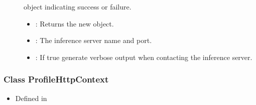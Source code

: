 \documentclass[letterpaper,10pt,english]{sphinxmanual}
\begin{document}
\begin{fulllineitems}
\begin{fulllineitems}
\begin{description}
\item[{}] \leavevmode
{\hyperref[\detokenize{cpp_api/classnvidia_1_1inferenceserver_1_1client_1_1Error:classnvidia_1_1inferenceserver_1_1client_1_1Error}]{}} object indicating success or failure. 

\item[{}] \leavevmode\begin{itemize}
\item {} 
: Returns the new {\hyperref[\detokenize{cpp_api/classnvidia_1_1inferenceserver_1_1client_1_1ProfileContext:classnvidia_1_1inferenceserver_1_1client_1_1ProfileContext}]{}} object. 

\item {} 
: The inference server name and port. 

\item {} 
: If true generate verbose output when contacting the inference server. 

\end{itemize}

\end{description}


\end{fulllineitems}


\end{fulllineitems}



\subsubsection{Class ProfileHttpContext}
\label{\detokenize{cpp_api/classnvidia_1_1inferenceserver_1_1client_1_1ProfileHttpContext:class-profilehttpcontext}}\label{\detokenize{cpp_api/classnvidia_1_1inferenceserver_1_1client_1_1ProfileHttpContext:exhale-class-classnvidia-1-1inferenceserver-1-1client-1-1profilehttpcontext}}\label{\detokenize{cpp_api/classnvidia_1_1inferenceserver_1_1client_1_1ProfileHttpContext::doc}}\begin{itemize}
\item {} 
Defined in {\hyperref[\detokenize{cpp_api/file_src_clients_c++_request.h:file-src-clients-c-request-h}]{}}

\end{itemize}
\end{document}
